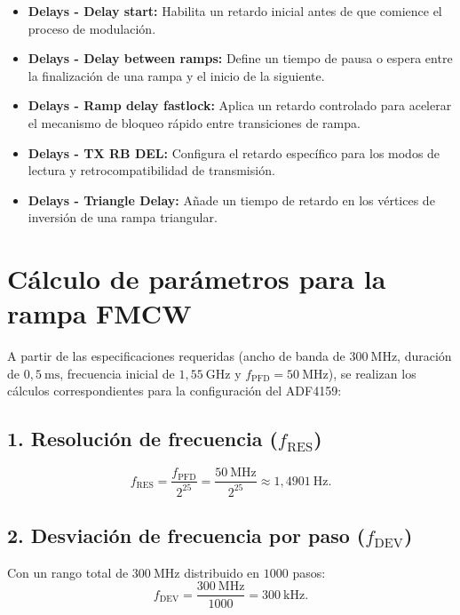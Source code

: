 \begin{itemize}
    \item \textbf{Delays - Delay start:} Habilita un retardo inicial antes de que comience el proceso de modulación.
    
    \item \textbf{Delays - Delay between ramps:} Define un tiempo de pausa o espera entre la finalización de una rampa y el inicio de la siguiente.
    
    \item \textbf{Delays - Ramp delay fastlock:} Aplica un retardo controlado para acelerar el mecanismo de bloqueo rápido entre transiciones de rampa.
    
    \item \textbf{Delays - TX RB DEL:} Configura el retardo específico para los modos de lectura y retrocompatibilidad de transmisión.
    
    \item \textbf{Delays - Triangle Delay:} Añade un tiempo de retardo en los vértices de inversión de una rampa triangular.
\end{itemize}

\section{Cálculo de parámetros para la rampa FMCW}
A partir de las especificaciones requeridas (ancho de banda de $300~\mathrm{MHz}$, duración de $0{,}5~\mathrm{ms}$, frecuencia inicial de $1{,}55~\mathrm{GHz}$ y $f_{\mathrm{PFD}} = 50~\mathrm{MHz}$), se realizan los cálculos correspondientes para la configuración del ADF4159:

\subsection*{1. Resolución de frecuencia ($f_{\mathrm{RES}}$)}
\begin{equation}
f_{\mathrm{RES}} = \frac{f_{\mathrm{PFD}}}{2^{25}} = \frac{50~\mathrm{MHz}}{2^{25}} \approx 1{,}4901~\mathrm{Hz}.
\end{equation}

\subsection*{2. Desviación de frecuencia por paso ($f_{\mathrm{DEV}}$)}
Con un rango total de $300~\mathrm{MHz}$ distribuido en $1000$ pasos:
\begin{equation}
f_{\mathrm{DEV}} = \frac{300~\mathrm{MHz}}{1000} = 300~\mathrm{kHz}.
\end{equation}

